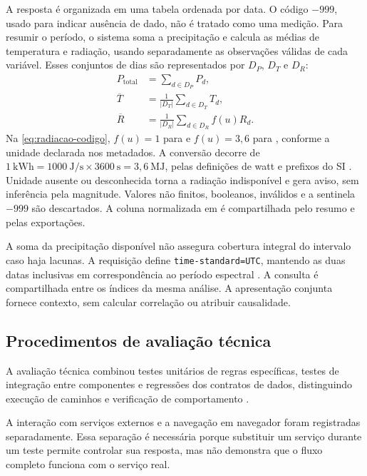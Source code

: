 A resposta é organizada em uma tabela ordenada por data. O código $-999$, usado para indicar ausência de dado, não é tratado como uma medição. Para resumir o período, o sistema soma a precipitação e calcula as médias de temperatura e radiação, usando separadamente as observações válidas de cada variável. Esses conjuntos de dias são representados por $D_P$, $D_T$ e $D_R$:
\begin{align}
 P_{\mathrm{total}}&=\sum_{d\in D_P} P_d,\\
 \overline{T}&=\frac{1}{|D_T|}\sum_{d\in D_T}T_d,\\
 \overline{R}&=\frac{1}{|D_R|}\sum_{d\in D_R} f(u)R_d.\label{eq:radiacao-codigo}
\end{align}
Na \cref{eq:radiacao-codigo}, $f(u)=1$ para \radiacaoTCC{} e $f(u)=3{,}6$ para \radiacaoKWhTCC{}, conforme a unidade declarada nos metadados. A conversão decorre de $1\ \mathrm{kWh}=1000\ \mathrm{J/s}\times3600\ \mathrm{s}=3{,}6\ \mathrm{MJ}$, pelas definições de watt e prefixos do SI \citep{BIPM_SI}. Unidade ausente ou desconhecida torna a radiação indisponível e gera aviso, sem inferência pela magnitude. Valores não finitos, booleanos, inválidos e a sentinela $-999$ são descartados. A coluna normalizada em \radiacaoTCC{} é compartilhada pelo resumo e pelas exportações.

A soma da precipitação disponível não assegura cobertura integral do intervalo caso haja lacunas. A requisição define \texttt{time-standard=UTC}, mantendo as duas datas inclusivas em correspondência ao período espectral \citep{NASA_POWER_DAILY}. A consulta é compartilhada entre os índices da mesma análise. A apresentação conjunta fornece contexto, sem calcular correlação ou atribuir causalidade.

\subsection{Procedimentos de avaliação técnica}\label{sec:avaliacao-final}

A avaliação técnica combinou testes unitários de regras específicas, testes de integração entre componentes e regressões dos contratos de dados, distinguindo execução de caminhos e verificação de comportamento \citep{BENDER2020}.

A interação com serviços externos e a navegação em navegador foram registradas separadamente. Essa separação é necessária porque substituir um serviço durante um teste permite controlar sua resposta, mas não demonstra que o fluxo completo funciona com o serviço real.

